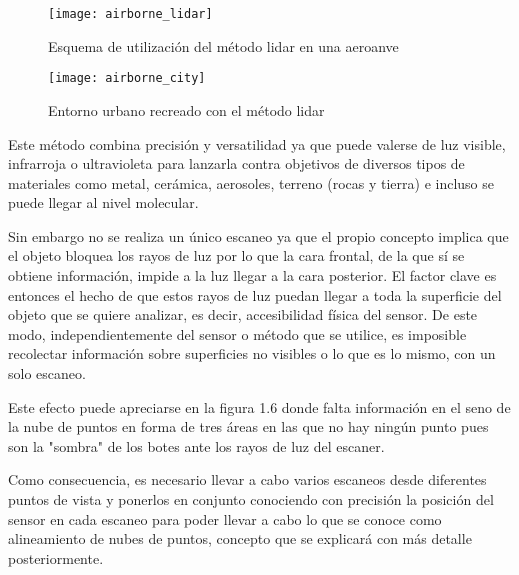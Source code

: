  
\begin{figure}
  \texttt{[image: airborne\_lidar]}
  \caption{Esquema de utilización del método lidar en una aeroanve}\label{fig:airborne_lidar}
\endminipage\hfill
{}
  \texttt{[image: airborne\_city]}
  \caption{Entorno urbano recreado con el método lidar}\label{fig:airborne_city}
\endminipage\hfill

\end{figure}

Este método combina precisión y versatilidad ya que puede valerse de luz visible, infrarroja o ultravioleta para lanzarla contra objetivos de diversos tipos de materiales como metal, cerámica, aerosoles, terreno (rocas y tierra) e incluso se puede llegar al nivel molecular. 
 
Sin embargo no se realiza un único escaneo ya que el propio concepto implica que el objeto bloquea los rayos de luz por lo que la cara frontal, de la que sí se obtiene información, impide a la luz llegar a la cara posterior. El factor clave es entonces el hecho de que estos rayos de luz puedan llegar a toda la superficie del objeto que se quiere analizar, es decir, accesibilidad física del sensor.
De este modo, independientemente del sensor o método que se utilice, es imposible recolectar
información sobre superficies no visibles o lo que es lo mismo, con un solo escaneo.

Este efecto puede apreciarse en la figura 1.6 donde falta información en el seno de la nube de puntos en forma de tres áreas en las que no hay ningún punto pues son la "sombra" de los botes ante los rayos de luz del escaner.

Como consecuencia, es necesario llevar a cabo varios escaneos desde diferentes puntos de vista y
ponerlos en conjunto conociendo con precisión la posición del sensor en cada escaneo para poder llevar a cabo lo que se conoce como alineamiento de nubes de puntos, concepto que se explicará con más detalle posteriormente.



